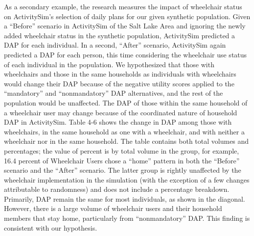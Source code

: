 \documentclass[3p, authoryear, review]{elsarticle} %
\begin{document}
As a secondary example, the research measures the impact of
wheelchair status on ActivitySim's selection of daily plans for our given
synthetic population. Given a ``Before'' scenario in ActivitySim of the Salt Lake
Area and ignoring the newly added wheelchair status in the synthetic population,
ActivitySim predicted a DAP for each individual. In a second, ``After'' scenario,
ActivitySim again predicted a DAP for each person, this time considering the
wheelchair use status of each individual in the population. We hypothesized that
those with wheelchairs and those in the same households as individuals with
wheelchairs would change their DAP because of the negative utility scores
applied to the ``mandatory'' and ``nonmandatory'' DAP alternatives, and the rest of
the population would be unaffected. The DAP of those within the same household
of a wheelchair user may change because of the coordinated nature of household
DAP in ActivitySim. Table 4-6 shows the change in DAP among those with
wheelchairs, in the same household as one with a wheelchair, and with neither a
wheelchair nor in the same household. The table contains both total volumes and
percentages; the value of percent is by total volume in the group, for example,
16.4 percent of Wheelchair Users chose a ``home'' pattern in both the ``Before''
scenario and the ``After'' scenario. The latter group is rightly unaffected by
the wheelchair implementation in the simulation (with the exception of a few
changes attributable to randomness) and does not include a percentage breakdown.
Primarily, DAP remain the same for most individuals, as shown in the diagonal.
However, there is a large volume of wheelchair users and their household members
that stay home, particularly from ``nonmandatory'' DAP. This finding is consistent
with our hypothesis.
\end{document}
